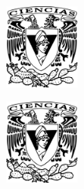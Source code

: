 
  
\begin{titlepage}



\begin{center}

\noindent
\begin{minipage}[c][0.99\textheight][c]{0.2\textwidth}%
	\noindent\begin{minipage}[t][0.15\textheight][c]{\textwidth}
		\begin{center}	
		\includegraphics[height=2.718cm]{gfx/Escudo-FCIENCIAS.pdf}
		\end{center}
	\end{minipage}%
        \vspace{14.4cm}
	\noindent\begin{minipage}[b][0.15\textheight][c]{\textwidth}
		\begin{center}	
		\includegraphics[height=2.718cm]{gfx/Escudo-FCIENCIAS.pdf}
		\end{center}
	\end{minipage}%
\end{minipage}
\hfil%
\begin{minipage}[c][0.99\textheight][t]{0.9\textwidth}
	\begin{center}
        \large


\end{center}
\end{minipage}
\end{center}
\end{titlepage}
